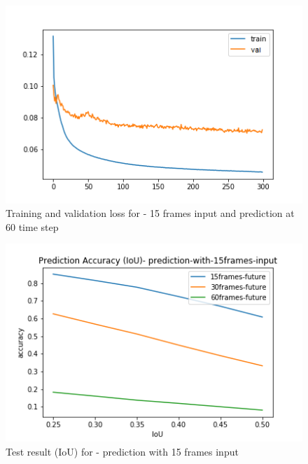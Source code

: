 \begin{figure}[H] 
\includegraphics[scale=0.8]{conf9_300e_60ffuture}
\begin{center}
\caption{Training and validation loss for - 15 frames input and prediction at 60 time step }
\label{15-60}
\end{center}
\end{figure}

\begin{figure}[H] 
\includegraphics[scale=0.8]{prediction-with-15frames-input_IoU}
\begin{center}
\caption{Test result (IoU) for - prediction with 15 frames input}
\label{15-IoU}
\end{center}
\end{figure}

